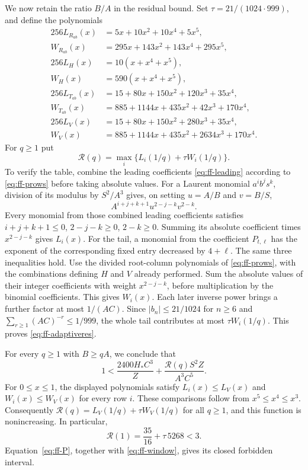 \documentclass[12pt]{article}
\numberwithin{equation}{section}
\begin{document}
We now retain the ratio $B/A$ in the residual bound.
Set $\tau=21/(1024\cdot999)$, and define the polynomials
\[
\begin{aligned}
 256L_{R_{ab}}(x)&=5x+10x^2+10x^4+5x^5,\\
 W_{R_{ab}}(x)&=295x+143x^2+143x^4+295x^5,\\
 256L_H(x)&=10(x+x^4+x^5),\\
 W_H(x)&=590(x+x^4+x^5),\\
 256L_{T_{ab}}(x)&=15+80x+150x^2+120x^3+35x^4,\\
 W_{T_{ab}}(x)&=885+1144x+435x^2+42x^3+170x^4,\\
 256L_V(x)&=15+80x+150x^2+280x^3+35x^4,\\
 W_V(x)&=885+1144x+435x^2+2634x^3+170x^4.
\end{aligned}
\]
For $q\ge1$ put
\begin{equation}\label{eq:ff-adaptiveres}
 \mathcal R(q)=\max_i\{L_i(1/q)+\tau W_i(1/q)\}.
\end{equation}
To verify the table, combine the leading coefficients
\eqref{eq:ff-leading} according to \eqref{eq:ff-prows} before taking
absolute values. For a Laurent monomial $a^ib^js^k$, division of its
modulus by $S^2/A^3$ gives, on setting $u=A/B$ and $v=B/S$,
\[
 A^{i+j+k+1}u^{2-j-k}v^{2-k}.
\]
Every monomial from those combined leading coefficients satisfies
$i+j+k+1\le0$, $2-j-k\ge0$, $2-k\ge0$.
Summing its absolute coefficient times $x^{2-j-k}$ gives $L_i(x)$.
For the tail, a monomial from the coefficient $P_{t,\ell}$ has the exponent of the corresponding fixed entry decreased by $4+\ell$. The same three inequalities
hold. Use the divided root-column polynomials of \eqref{eq:ff-prows}, with
the combinations defining $H$ and $V$ already performed. Sum the absolute
values of their integer coefficients with weight $x^{2-j-k}$, before
multiplication by the binomial coefficients. This gives $W_i(x)$.
Each later inverse power brings a further factor at most $1/(AC)$.
Since $|b_n|\le21/1024$ for $n\ge6$ and
$\sum_{r\ge1}(AC)^{-r}\le1/999$, the whole tail contributes at most
$\tau W_i(1/q)$. This proves \eqref{eq:ff-adaptiveres}.

For every $q\ge1$ with $B\ge qA$, we conclude that
\begin{equation}\label{eq:ff-P}
 1<\frac{2400H_*C^3}{Z}
       +\frac{\mathcal R(q)S^2Z}{A^3C^5}.
\end{equation}
For $0\le x\le1$, the displayed polynomials satisfy
$L_i(x)\le L_V(x)$ and $W_i(x)\le W_V(x)$ for every row $i$.
These comparisons follow from $x^5\le x^4\le x^3$.
Consequently $\mathcal R(q)=L_V(1/q)+\tau W_V(1/q)$ for all $q\ge1$,
and this function is nonincreasing.
In particular,
\[
 \mathcal R(1)=\frac{35}{16}+\tau\,5268<3.
\]
Equation~\eqref{eq:ff-P}, together with \eqref{eq:ff-window}, gives
its closed forbidden interval.
\end{document}
